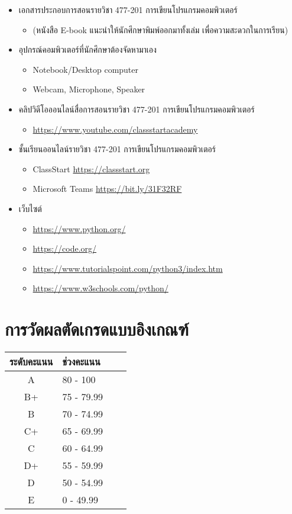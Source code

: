 \begin{itemize}
\item เอกสารประกอบการสอนรายวิชา 477-201 การเขียนโปรแกรมคอมพิวเตอร์ 
    \begin{itemize}
    \item (หนังสือ E-book แนะนำให้นักศึกษาพิมพ์ออกมาทั้งเล่ม เพื่อความสะดวกในการเรียน)
    \end{itemize}
\item อุปกรณ์คอมพิวเตอร์ที่นักศึกษาต้องจัดหามาเอง
    \begin{itemize}
    \item Notebook/Desktop computer
    \item Webcam, Microphone, Speaker
    \end{itemize}
\item คลิปวิดีโอออนไลน์สื่อการสอนรายวิชา 477-201 การเขียนโปรแกรมคอมพิวเตอร์
    \begin{itemize}
    \item \url{https://www.youtube.com/classstartacademy}
    \end{itemize}
\item ชั้นเรียนออนไลน์รายวิชา 477-201 การเขียนโปรแกรมคอมพิวเตอร์
    \begin{itemize}
    \item ClassStart \url{https://classstart.org}
    \item Microsoft Teams \url{ https://bit.ly/31F32RF}
    \end{itemize}
\item เว็บไซต์
    \begin{itemize}
    \item \url{https://www.python.org/}
    \item \url{https://code.org/}
    \item \url{https://www.tutorialspoint.com/python3/index.htm}
    \item \url{https://www.w3schools.com/python/}
    \end{itemize}
\end{itemize}


\section*{การวัดผลตัดเกรดแบบอิงเกณฑ์}

\begin{center}
\begin{tabu}{c l r r}
 \hline
 ระดับคะแนน & ช่วงคะแนน \\ [0.5ex] 
 \hline
A & 80 - 100 \\
B+  & 75 - 79.99  \\
B  & 70 - 74.99  \\
C+ & 65 - 69.99  \\
C  & 60 - 64.99  \\
D+  & 55 - 59.99  \\
D  & 50 - 54.99  \\
E  & 0 - 49.99 \\
\hline
\end{tabu}
\end{center}

